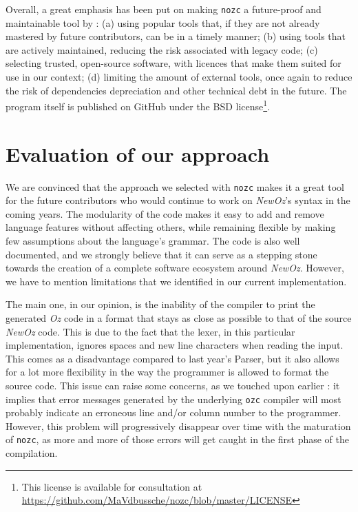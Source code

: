 Overall, a great emphasis has been put on making \texttt{nozc} a future-proof and maintainable tool by : (a) using popular tools that, if they are not already mastered by future contributors, can be in a timely manner; (b) using tools that are actively maintained, reducing the risk associated with legacy code; (c) selecting trusted, open-source software, with licences that make them suited for use in our context; (d) limiting the amount of external tools, once again to reduce the risk of dependencies depreciation and other technical debt in the future.
The program itself is published on GitHub under the BSD license\footnote{This license is available for consultation at \url{https://github.com/MaVdbussche/nozc/blob/master/LICENSE}}.

\section{Evaluation of our approach}\label{sec:ch3-pros-cons}
We are convinced that the approach we selected with \texttt{nozc} makes it a great tool for the future contributors who would continue to work on \textit{NewOz}'s syntax in the coming years.
The modularity of the code makes it easy to add and remove language features without affecting others, while remaining flexible by making few assumptions about the language's grammar.
The code is also well documented, and we strongly believe that it can serve as a stepping stone towards the creation of a complete software ecosystem around \textit{NewOz}.
However, we have to mention limitations that we identified in our current implementation.\newline

The main one, in our opinion, is the inability of the compiler to print the generated \textit{Oz} code in a format that stays as close as possible to that of the source \textit{NewOz} code.
This is due to the fact that the lexer, in this particular implementation, ignores spaces and new line characters when reading the input.
This comes as a disadvantage compared to last year's Parser, but it also allows for a lot more flexibility in the way the programmer is allowed to format the source code.
This issue can raise some concerns, as we touched upon earlier : it implies that error messages generated by the underlying \texttt{ozc} compiler will most probably indicate an erroneous line and/or column number to the programmer.
However, this problem will progressively disappear over time with the maturation of \texttt{nozc}, as more and more of those errors will get caught in the first phase of the compilation.\newline

